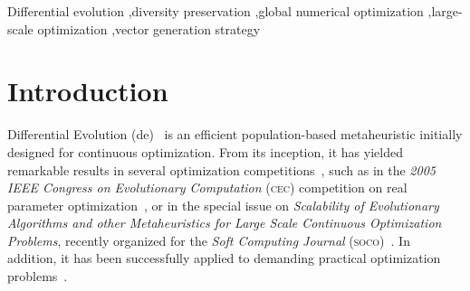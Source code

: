 \documentclass[preprint,3p]{elsarticle}
\newcommand{\DE}{{\sc de}}
\begin{document}
\begin{frontmatter}
\begin{keyword}
Differential evolution \sep diversity preservation \sep global numerical optimization \sep large-scale optimization \sep vector generation strategy
\end{keyword}

\end{frontmatter}

\linenumbers

\section{Introduction}
%
%
%
%
Differential Evolution (\DE{})~\cite{Storn:95} is an efficient population-based metaheuristic initially designed
for continuous optimization.
%
From its inception, it has yielded remarkable results in several optimization competitions~\cite{Das:11}, such as in 
%
%
the {\em 2005 IEEE Congress on Evolutionary Computation} (\textsc{cec}) competition on real parameter optimization~\cite{Das:05}, or in the special issue
on {\em Scalability of Evolutionary Algorithms and other Metaheuristics for Large Scale Continuous Optimization Problems},
recently organized for the {\em Soft Computing Journal} (\textsc{soco})~\cite{LaTorre:11}.
%
In addition, it has been successfully applied to demanding practical optimization problems~\cite{Zhao:14,Ghasemi:14}.
%
\end{document}
